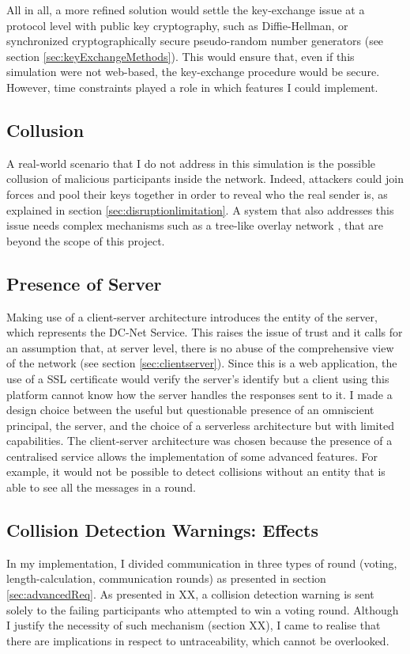 All in all, a more refined solution would settle the key-exchange issue at a protocol level with public key cryptography, such as Diffie-Hellman, or synchronized cryptographically secure pseudo-random number generators (see section \ref{sec:keyExchangeMethods}). This would ensure that, even if this simulation were not web-based, the key-exchange procedure would be secure. However, time constraints played a role in which features I could implement.

\subsection{Collusion}
A real-world scenario that I do not address in this simulation is the possible collusion of malicious participants inside the network. Indeed, attackers could join forces and pool their keys together in order to reveal who the real sender is, as explained in section \ref{sec:disruptionlimitation}. A system that also addresses this issue needs complex mechanisms such as a tree-like overlay network \cite{Wang}, that are beyond the scope of this project.

\subsection{Presence of Server} \label{sec:evalServerPresence}
Making use of a client-server architecture introduces the entity of the server, which represents the DC-Net Service. This raises the issue of trust and it calls for an assumption that, at server level, there is no abuse of the comprehensive view of the network (see section \ref{sec:clientserver}). Since this is a web application, the use of a SSL certificate would verify the server's identify but a client using this platform cannot know how the server handles the responses sent to it. I made a design choice between the useful but questionable presence of an omniscient principal, the server, and the choice of a serverless architecture but with limited capabilities. The client-server architecture was chosen because the presence of a centralised service allows the implementation of some advanced features. For example, it would not be possible to detect collisions without an entity that is able to see all the messages in a round.

\subsection{Collision Detection Warnings: Effects} \label{sec:collisionDetectionWarnings}
In my implementation, I divided communication in three types of round (voting, length-calculation, communication rounds) as presented in section \ref{sec:advancedReq}.
As presented in XX, a collision detection warning is sent solely to the failing participants who attempted to win a voting round. Although I justify the necessity of such mechanism (section XX), I came to realise that there are implications in respect to untraceability, which cannot be overlooked.


